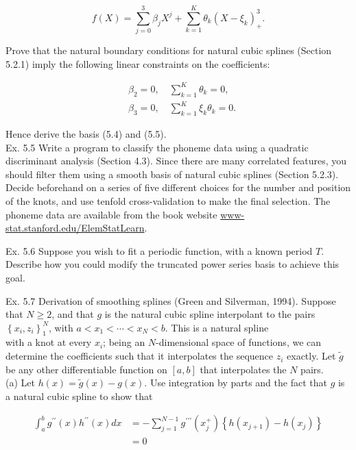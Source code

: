 \documentclass[10pt]{article}
\begin{document}
\begin{equation*}
f(X)=\sum_{j=0}^{3} \beta_{j} X^{j}+\sum_{k=1}^{K} \theta_{k}\left(X-\xi_{k}\right)_{+}^{3} . \tag{5.70}
\end{equation*}


Prove that the natural boundary conditions for natural cubic splines (Section 5.2.1) imply the following linear constraints on the coefficients:


\begin{align*}
& \beta_{2}=0, \quad \sum_{k=1}^{K} \theta_{k}=0,  \tag{5.71}\\
& \beta_{3}=0, \quad \sum_{k=1}^{K} \xi_{k} \theta_{k}=0 .
\end{align*}


Hence derive the basis (5.4) and (5.5).\\
Ex. 5.5 Write a program to classify the phoneme data using a quadratic discriminant analysis (Section 4.3). Since there are many correlated features, you should filter them using a smooth basis of natural cubic splines (Section 5.2.3). Decide beforehand on a series of five different choices for the number and position of the knots, and use tenfold cross-validation to make the final selection. The phoneme data are available from the book website \href{http://www-stat.stanford.edu/ElemStatLearn}{www-stat.stanford.edu/ElemStatLearn}.

Ex. 5.6 Suppose you wish to fit a periodic function, with a known period $T$. Describe how you could modify the truncated power series basis to achieve this goal.

Ex. 5.7 Derivation of smoothing splines (Green and Silverman, 1994). Suppose that $N \geq 2$, and that $g$ is the natural cubic spline interpolant to the pairs $\left\{x_{i}, z_{i}\right\}_{1}^{N}$, with $a<x_{1}<\cdots<x_{N}<b$. This is a natural spline\\
with a knot at every $x_{i}$; being an $N$-dimensional space of functions, we can determine the coefficients such that it interpolates the sequence $z_{i}$ exactly. Let $\tilde{g}$ be any other differentiable function on $[a, b]$ that interpolates the $N$ pairs.\\
(a) Let $h(x)=\tilde{g}(x)-g(x)$. Use integration by parts and the fact that $g$ is a natural cubic spline to show that


\begin{align*}
\int_{a}^{b} g^{\prime \prime}(x) h^{\prime \prime}(x) d x & =-\sum_{j=1}^{N-1} g^{\prime \prime \prime}\left(x_{j}^{+}\right)\left\{h\left(x_{j+1}\right)-h\left(x_{j}\right)\right\}  \tag{5.72}\\
& =0
\end{align*}
\end{document}
